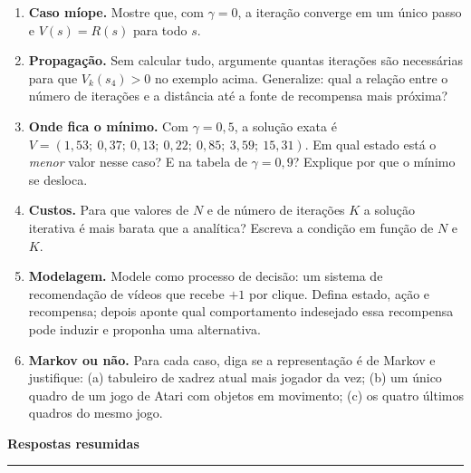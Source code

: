 \documentclass[10pt, a4paper]{article}
\newcounter{secao}
\newcommand{\secao}[1]{%
  \stepcounter{secao}%
  \vspace{0.7em}%
  \noindent{\color{rlLaranja}\rule{1.6em}{2pt}}\hspace{0.5em}%
  {\color{rlCinza}\footnotesize\bfseries\thesecao}\hspace{0.35em}%
  {\color{rlAzul}\large\bfseries #1}%
  \par\vspace{-0.15em}%
  {\color{rlAzul!22}\rule{\linewidth}{0.6pt}}%
  \par\vspace{0.25em}}
\newcommand{\rec}{R}
\begin{document}
\begin{enumerate}[leftmargin=1.4em, itemsep=0.4ex, topsep=0.2ex]
  \item \textbf{Caso míope.} Mostre que, com $\gamma = 0$, a iteração converge
        em um único passo e $V(s) = \rec(s)$ para todo $s$.
  \item \textbf{Propagação.} Sem calcular tudo, argumente quantas iterações são
        necessárias para que $V_k(s_4) > 0$ no exemplo acima. Generalize: qual
        a relação entre o número de iterações e a distância até a fonte de
        recompensa mais próxima?
  \item \textbf{Onde fica o mínimo.} Com $\gamma = 0{,}5$, a solução exata é
        $V = (1{,}53;\ 0{,}37;\ 0{,}13;\ 0{,}22;\ 0{,}85;\ 3{,}59;\ 15{,}31)$.
        Em qual estado está o \emph{menor} valor nesse caso? E na tabela de
        $\gamma = 0{,}9$? Explique por que o mínimo se desloca.
  \item \textbf{Custos.} Para que valores de $N$ e de número de iterações $K$ a
        solução iterativa é mais barata que a analítica? Escreva a condição em
        função de $N$ e $K$.
  \item \textbf{Modelagem.} Modele como processo de decisão: um sistema de
        recomendação de vídeos que recebe $+1$ por clique. Defina estado, ação e
        recompensa; depois aponte qual comportamento indesejado essa recompensa
        pode induzir e proponha uma alternativa.
  \item \textbf{Markov ou não.} Para cada caso, diga se a representação é de
        Markov e justifique: (a) tabuleiro de xadrez atual mais jogador da vez;
        (b) um único quadro de um jogo de Atari com objetos em movimento;
        (c) os quatro últimos quadros do mesmo jogo.
\end{enumerate}

\secao{Respostas resumidas}
\end{document}
